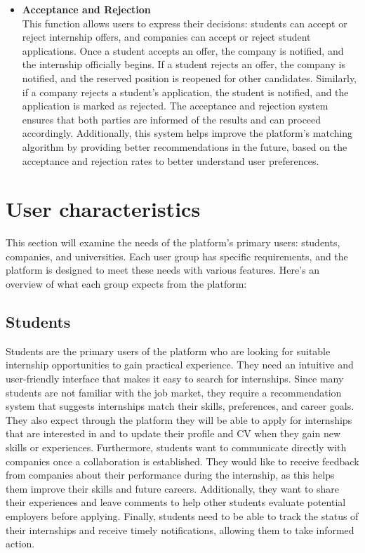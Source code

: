 \begin{itemize}[label={ }]
    \item \textcolor{bluepoli}{\textbf{Acceptance and Rejection}}
    \\This function allows users to express their decisions: students can accept or reject internship offers, and companies can accept or reject student applications.
    Once a student accepts an offer, the company is notified, and the internship officially begins. If a student rejects an offer, the company is notified, and the 
    reserved position is reopened for other candidates. Similarly, if a company rejects a student’s application, the student is notified, and the application is 
    marked as rejected.
    The acceptance and rejection system ensures that both parties are informed of the results and can proceed accordingly. Additionally, this system helps 
    improve the platform's matching algorithm by providing better recommendations in the future, based on the acceptance and rejection rates to better understand 
    user preferences.
\end{itemize}

\section{User characteristics}\label{subsec:user_characteristics}
This section will examine the needs of the platform's primary users: students, companies, and universities. 
Each user group has specific requirements, and the platform is designed to meet these needs with various features. 
Here’s an overview of what each group expects from the platform:

\subsection{Students}
Students are the primary users of the platform who are looking for suitable internship opportunities to gain practical experience. They need an intuitive and 
user-friendly interface that makes it easy to search for internships. Since many students are not familiar with the job market, they require a recommendation 
system that suggests internships match their skills, preferences, and career goals. They also expect through the platform they will be able to apply for internships
that are interested in and to update their profile and CV when they gain new skills or experiences.
Furthermore, students want to communicate directly with companies once a collaboration is established. They would like to receive feedback from companies about 
their performance during the internship, as this helps them improve their skills and future careers. Additionally, they want to share their experiences and 
leave comments to help other students evaluate potential employers before applying.
Finally, students need to be able to track the status of their internships and receive timely notifications, allowing them to take informed action.

